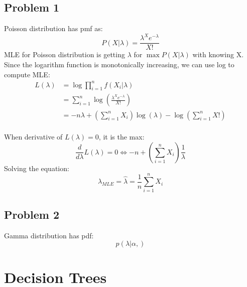 \documentclass{article}
\begin{document}
\subsection{Problem 1}
Poisson distribution has pmf as: \\
\begin{displaymath}
P(X|\lambda)=\frac{{\lambda^X}{e^{-\lambda}}}{X!}
\end{displaymath}
MLE for Poisson distribution is getting $\lambda$ for $\max P(X|\lambda)$ with knowing X.\\
Since the logarithm function is monotonically increasing, we can use log to compute MLE:\\
\begin{align*}
L(\lambda)&=\log{\prod_{i=1}^n}f(X_i|\lambda)\\
			&=\sum_{i=1}^n \log(\frac{\lambda^X e^{-\lambda}}{X!})\\
			&=-n\lambda + (\sum_{i=1}^n X_i)\log(\lambda)-\log(\sum_{i=1}^n X!)
\end{align*}\\

When derivative of $L(\lambda)=0$, it is the max:\\
\begin{displaymath}	
\frac{d}{d\lambda}L(\lambda)=0 \Leftrightarrow -n+(\sum_{i=1}^n X_i)\frac{1}{\lambda}
\end{displaymath}
Solving the equation:\\
\begin{displaymath}
\lambda_{MLE}=\hat{\lambda}=\frac{1}{n}\sum_{i=1}^n X_i
\end{displaymath}



 



\subsection{Problem 2}
Gamma distribution has pdf:\\
\begin{displaymath}
p(\lambda|\alpha,)
\end{displaymath}




\section{Decision Trees}
\end{document}
